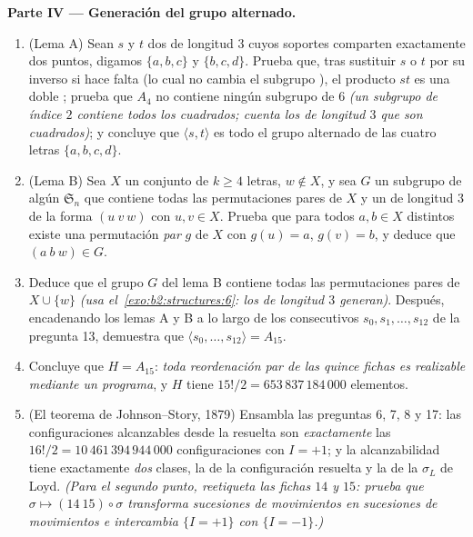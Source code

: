 \begin{problem}
\medskip
\noindent\textbf{Parte IV --- Generación del grupo alternado.}
\begin{enumerate}[resume]
  \item (Lema A) Sean $s$ y $t$ dos  de longitud $3$ cuyos
        soportes comparten exactamente dos puntos, digamos $\{a,
        b, c\}$ y $\{b, c, d\}$. Prueba que, tras sustituir $s$ o
        $t$ por su inverso si hace falta (lo cual no cambia el
        subgrupo ), el producto $st$ es una doble
        ; prueba que $A_4$ no contiene ningún
        subgrupo de  $6$ \emph{(un subgrupo de índice $2$
        contiene todos los cuadrados; cuenta los  de
        longitud $3$ que son cuadrados)}; y concluye que $\langle
        s, t\rangle$ es todo el grupo alternado de las cuatro
        letras $\{a, b, c, d\}$.
  \item (Lema B) Sea $X$ un conjunto de $k \geq 4$ letras, $w
        \notin X$, y sea $G$ un subgrupo de algún
        $\mathfrak{S}_n$ que contiene todas las permutaciones
        pares de $X$ y un  de longitud $3$ de la forma $(u\
        v\ w)$ con $u, v \in X$. Prueba que para todos $a, b \in
        X$ distintos existe una permutación \emph{par} $g$ de $X$
        con $g(u) = a$, $g(v) = b$, y deduce que $(a\ b\ w) \in
        G$.
  \item Deduce que el grupo $G$ del lema B contiene todas las
        permutaciones pares de $X \cup \{w\}$ \emph{(usa el~\cref{exo:b2:structures:6}: los  de longitud $3$
        generan)}. Después, encadenando los lemas A y B a lo largo
        de los \omterm{def:b2:structures:sn}{ciclos} consecutivos $s_0, s_1, \dots, s_{12}$ de la
        pregunta 13, demuestra que $\langle s_0, \dots,
        s_{12}\rangle = A_{15}$.
  \item Concluye que $H = A_{15}$: \emph{toda reordenación par de
        las quince fichas es realizable mediante un programa}, y
        $H$ tiene $15!/2 = 653\,837\,184\,000$ elementos.
  \item (El teorema de Johnson--Story, 1879) Ensambla las
        preguntas 6, 7, 8 y 17: las configuraciones alcanzables
        desde la resuelta son \emph{exactamente} las $16!/2 =
        10\,461\,394\,944\,000$ configuraciones con $I = +1$; y la
        alcanzabilidad tiene exactamente \emph{dos} clases, la de
        la configuración resuelta y la de la $\sigma_L$ de Loyd.
        \emph{(Para el segundo punto, reetiqueta las fichas $14$ y
        $15$: prueba que $\sigma \mapsto (14\ 15) \circ \sigma$
        transforma sucesiones de movimientos en sucesiones de
        movimientos e intercambia $\{I = +1\}$ con $\{I = -1\}$.)}
\end{enumerate}


\end{problem}
